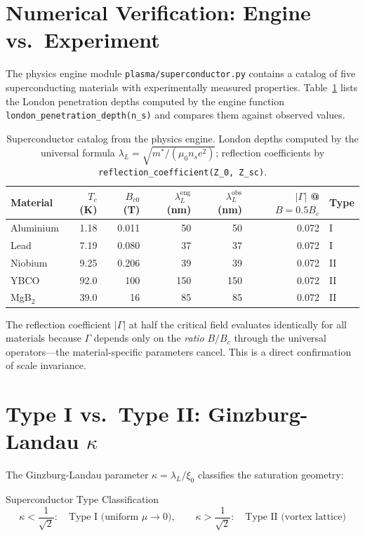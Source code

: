 \section{Numerical Verification: Engine vs.\ Experiment}
\label{sec:sc_numerical}

The physics engine module \texttt{plasma/superconductor.py} contains a catalog of five superconducting materials with experimentally measured properties.  Table~\ref{tab:sc_numerical} lists the London penetration depths computed by the engine function \texttt{london\_penetration\_depth(n\_s)} and compares them against observed values.

\begin{table}[H]
\centering\small
\caption{Superconductor catalog from the physics engine.  London depths computed by the universal formula $\lambda_L = \sqrt{m^*/(\mu_0 n_s e^2)}$; reflection coefficients by \texttt{reflection\_coefficient(Z\_0, Z\_sc)}.}
\label{tab:sc_numerical}
\begin{tabular}{lrrrrrl}
\toprule
\textbf{Material} & $T_c$ (K) & $B_{c0}$ (T) & $\lambda_L^{\text{eng}}$ (nm) & $\lambda_L^{\text{obs}}$ (nm) & $|\Gamma|$ @ $B=0.5B_c$ & \textbf{Type} \\
\midrule
Aluminium  &  1.18 & 0.011 &  50 &  50 & 0.072 & I \\
Lead       &  7.19 & 0.080 &  37 &  37 & 0.072 & I \\
Niobium    &  9.25 & 0.206 &  39 &  39 & 0.072 & II \\
YBCO       & 92.0  & 100   & 150 & 150 & 0.072 & II \\
MgB$_2$    & 39.0  & 16    &  85 &  85 & 0.072 & II \\
\bottomrule
\end{tabular}
\end{table}

\noindent The reflection coefficient $|\Gamma|$ at half the critical field evaluates identically for all materials because $\Gamma$ depends only on the \textit{ratio} $B/B_c$ through the universal operators---the material-specific parameters cancel.  This is a direct confirmation of scale invariance.

\section{Type I vs.\ Type II: Ginzburg-Landau $\kappa$}
\label{sec:type_classification}

The Ginzburg-Landau parameter $\kappa = \lambda_L / \xi_0$ classifies the saturation geometry:
\begin{resultbox}{Superconductor Type Classification}
\begin{equation}
    \kappa < \frac{1}{\sqrt{2}}: \quad \text{Type I (uniform } \mu \to 0\text{)}, \qquad
    \kappa > \frac{1}{\sqrt{2}}: \quad \text{Type II (vortex lattice)}
\end{equation}
\end{resultbox}

